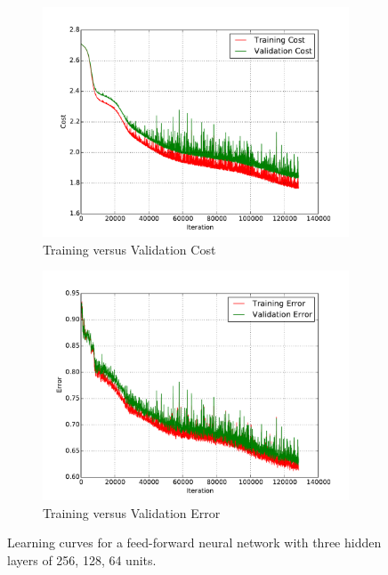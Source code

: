 \begin{figure}
	\centering
	\begin{subfigure}[b]{0.45\linewidth}
		\centering
		\includegraphics[width=\linewidth]{images/2/train_val_cost.pdf}
		\caption{Training versus Validation Cost}
	\end{subfigure}
	\hfill
	\begin{subfigure}[b]{0.45\linewidth}
		\centering
		\includegraphics[width=\linewidth]{images/2/train_val_error.pdf}
		\caption{Training versus Validation Error}
	\end{subfigure}
	\caption{Learning curves for a feed-forward neural network with three hidden layers of 256, 128, 64 units.} 
	\label{shrine0_curves}
\end{figure}
